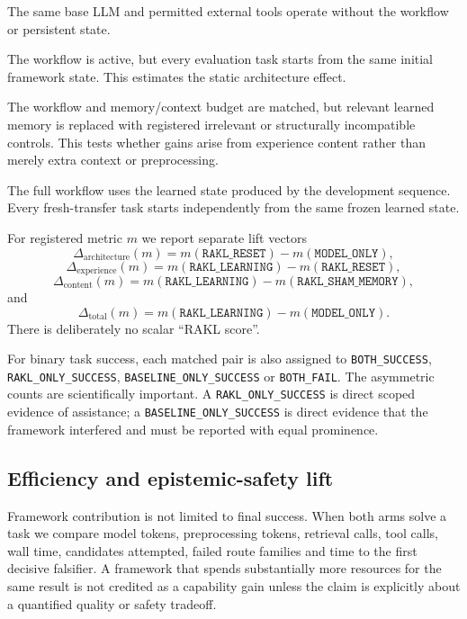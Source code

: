 \begin{description}[leftmargin=3.2cm,style=nextline]
\item[\texttt{MODEL\_ONLY}] The same base LLM and permitted external tools operate without the \RAKL{} workflow or persistent \RAKL{} state.
\item[\texttt{RAKL\_RESET}] The \RAKL{} workflow is active, but every evaluation task starts from the same initial framework state. This estimates the static architecture effect.
\item[\texttt{RAKL\_SHAM\_MEMORY}] The workflow and memory/context budget are matched, but relevant learned memory is replaced with registered irrelevant or structurally incompatible controls. This tests whether gains arise from experience content rather than merely extra context or preprocessing.
\item[\texttt{RAKL\_LEARNING}] The full workflow uses the learned state produced by the development sequence. Every fresh-transfer task starts independently from the same frozen learned state.
\end{description}

For registered metric $m$ we report separate lift vectors
\[
\Delta_{\mathrm{architecture}}(m)
=m(\texttt{RAKL\_RESET})-m(\texttt{MODEL\_ONLY}),
\]
\[
\Delta_{\mathrm{experience}}(m)
=m(\texttt{RAKL\_LEARNING})-m(\texttt{RAKL\_RESET}),
\]
\[
\Delta_{\mathrm{content}}(m)
=m(\texttt{RAKL\_LEARNING})-m(\texttt{RAKL\_SHAM\_MEMORY}),
\]
and
\[
\Delta_{\mathrm{total}}(m)
=m(\texttt{RAKL\_LEARNING})-m(\texttt{MODEL\_ONLY}).
\]
There is deliberately no scalar ``RAKL score''.

For binary task success, each matched pair is also assigned to \texttt{BOTH\_SUCCESS}, \texttt{RAKL\_ONLY\_SUCCESS}, \texttt{BASELINE\_ONLY\_SUCCESS} or \texttt{BOTH\_FAIL}. The asymmetric counts are scientifically important. A \texttt{RAKL\_ONLY\_SUCCESS} is direct scoped evidence of assistance; a \texttt{BASELINE\_ONLY\_SUCCESS} is direct evidence that the framework interfered and must be reported with equal prominence.

\subsection{Efficiency and epistemic-safety lift}

Framework contribution is not limited to final success. When both arms solve a task we compare model tokens, preprocessing tokens, retrieval calls, tool calls, wall time, candidates attempted, failed route families and time to the first decisive falsifier. A framework that spends substantially more resources for the same result is not credited as a capability gain unless the claim is explicitly about a quantified quality or safety tradeoff.

